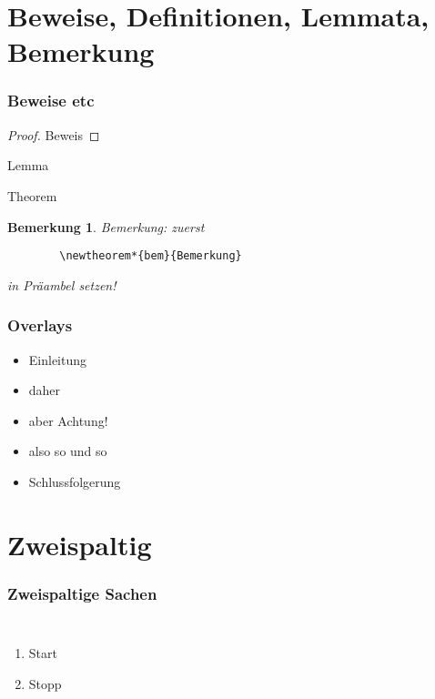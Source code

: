 \documentclass[9pt]{beamer}
\newtheorem*{bem}{Bemerkung} %
\begin{document}
\section{Beweise, Definitionen, Lemmata, Bemerkung}
\begin{frame}[fragile]
	\frametitle{Beweise etc}

    \begin{proof}
        Beweis
    \end{proof}
    
    \begin{lemma}
        Lemma
    \end{lemma}
    
    \begin{theorem}
        Theorem
    \end{theorem}
    
     \begin{bem}
	Bemerkung: zuerst 
	  \begin{verbatim}
	    \newtheorem*{bem}{Bemerkung}
	  \end{verbatim}
	  in Präambel setzen! 
     \end{bem}
\end{frame}

\begin{frame}
	\frametitle{Overlays}
   \begin{itemize}
        \item Einleitung
        \item<2-> daher
        \item<alert@3> aber Achtung!
        \item<3-> also so und so
        \item<4-> Schlussfolgerung
   \end{itemize}
\end{frame}


\section{Zweispaltig}
\begin{frame}
	\frametitle{Zweispaltige Sachen}
    \begin{columns}
                 \begin{enumerate}
                 \item Start
                 \item Stopp
                 \end{enumerate}
    \end{columns}
\end{frame}
\end{document}
